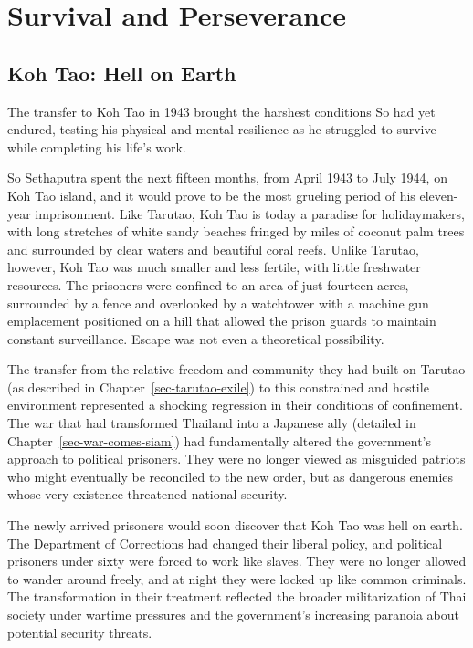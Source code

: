 \documentclass[
  Letterpaper,
]{scrbook}
\begin{document}

\chapter{Survival and Perseverance}\label{sec-survival-perseverance}

\section{Koh Tao: Hell on Earth}\label{koh-tao-hell-on-earth}

The transfer to Koh Tao in 1943 brought the harshest conditions So had
yet endured, testing his physical and mental resilience as he struggled
to survive while completing his life's work.

So Sethaputra spent the next fifteen months, from April 1943 to July
1944, on Koh Tao island, and it would prove to be the most grueling
period of his eleven-year imprisonment. Like Tarutao, Koh Tao is today a
paradise for holidaymakers, with long stretches of white sandy beaches
fringed by miles of coconut palm trees and surrounded by clear waters
and beautiful coral reefs. Unlike Tarutao, however, Koh Tao was much
smaller and less fertile, with little freshwater resources. The
prisoners were confined to an area of just fourteen acres, surrounded by
a fence and overlooked by a watchtower with a machine gun emplacement
positioned on a hill that allowed the prison guards to maintain constant
surveillance. Escape was not even a theoretical possibility.

The transfer from the relative freedom and community they had built on
Tarutao (as described in Chapter~\ref{sec-tarutao-exile}) to this
constrained and hostile environment represented a shocking regression in
their conditions of confinement. The war that had transformed Thailand
into a Japanese ally (detailed in Chapter~\ref{sec-war-comes-siam}) had
fundamentally altered the government's approach to political prisoners.
They were no longer viewed as misguided patriots who might eventually be
reconciled to the new order, but as dangerous enemies whose very
existence threatened national security.

The newly arrived prisoners would soon discover that Koh Tao was hell on
earth. The Department of Corrections had changed their liberal policy,
and political prisoners under sixty were forced to work like slaves.
They were no longer allowed to wander around freely, and at night they
were locked up like common criminals. The transformation in their
treatment reflected the broader militarization of Thai society under
wartime pressures and the government's increasing paranoia about
potential security threats.
\end{document}
